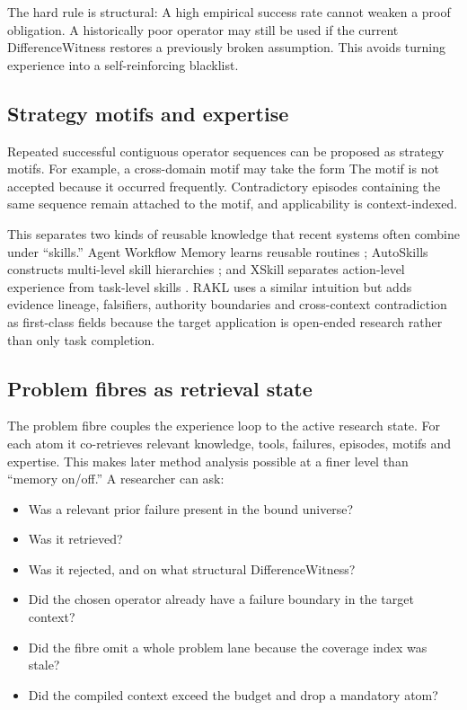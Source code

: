 The hard rule is structural:
A high empirical success rate cannot weaken a proof obligation. A historically poor operator may still be used if the current DifferenceWitness restores a previously broken assumption. This avoids turning experience into a self-reinforcing blacklist.

\subsection{Strategy motifs and expertise}

Repeated successful contiguous operator sequences can be proposed as strategy motifs. For example, a cross-domain motif may take the form
The motif is not accepted because it occurred frequently. Contradictory episodes containing the same sequence remain attached to the motif, and applicability is context-indexed.

This separates two kinds of reusable knowledge that recent systems often combine under ``skills.'' Agent Workflow Memory learns reusable routines \cite{wang2024awm}; AutoSkills constructs multi-level skill hierarchies \cite{wang2026autoskills}; and XSkill separates action-level experience from task-level skills \cite{jiang2026xskill}. RAKL uses a similar intuition but adds evidence lineage, falsifiers, authority boundaries and cross-context contradiction as first-class fields because the target application is open-ended research rather than only task completion.

\subsection{Problem fibres as retrieval state}

The problem fibre couples the experience loop to the active research state. For each atom it co-retrieves relevant knowledge, tools, failures, episodes, motifs and expertise. This makes later method analysis possible at a finer level than ``memory on/off.'' A researcher can ask:

\begin{itemize}[leftmargin=*]
\item Was a relevant prior failure present in the bound universe?
\item Was it retrieved?
\item Was it rejected, and on what structural DifferenceWitness?
\item Did the chosen operator already have a failure boundary in the target context?
\item Did the fibre omit a whole problem lane because the coverage index was stale?
\item Did the compiled context exceed the budget and drop a mandatory atom?
\end{itemize}

